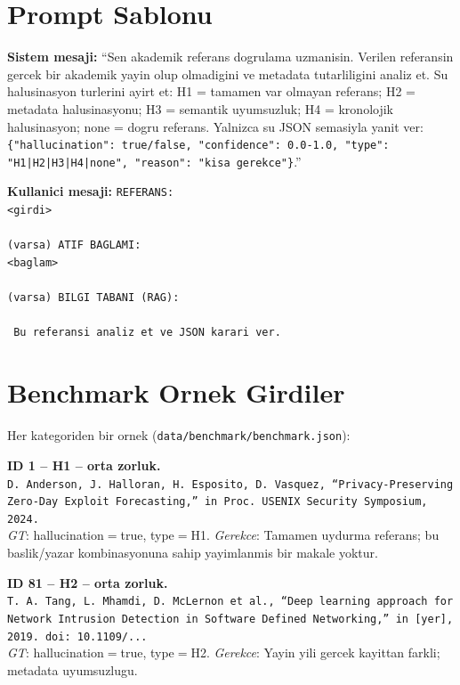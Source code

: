 \documentclass[11pt,a4paper]{article}
\begin{document}
\section{Prompt Sablonu}
\label{appx:prompt}
\textbf{Sistem mesaji:} ``Sen akademik referans dogrulama uzmanisin. Verilen
referansin gercek bir akademik yayin olup olmadigini ve metadata tutarliligini
analiz et. Su halusinasyon turlerini ayirt et: H1 = tamamen var olmayan
referans; H2 = metadata halusinasyonu; H3 = semantik uyumsuzluk;
H4 = kronolojik halusinasyon; none = dogru referans. Yalnizca su JSON
semasiyla yanit ver:
\texttt{\{"hallucination": true/false, "confidence": 0.0-1.0,
"type": "H1|H2|H3|H4|none", "reason": "kisa gerekce"\}}.''

\noindent\textbf{Kullanici mesaji:} \texttt{REFERANS:\\<girdi>\\\\(varsa)\
ATIF BAGLAMI:\\<baglam>\\\\(varsa)\ BILGI TABANI (RAG):\\<getirilen kayitlar>\\\
Bu referansi analiz et ve JSON karari ver.}

\section{Benchmark Ornek Girdiler}
\label{appx:benchmark}
Her kategoriden bir ornek (\texttt{data/benchmark/benchmark.json}):

\noindent\textbf{ID 1 -- H1 -- orta zorluk.}\\
\texttt{D. Anderson, J. Halloran, H. Esposito, D. Vasquez, ``Privacy-Preserving Zero-Day Exploit Forecasting,'' in Proc.\ USENIX Security Symposium, 2024.}\\
\textit{GT}: hallucination$=$true, type$=$H1.
\textit{Gerekce}: Tamamen uydurma referans; bu baslik/yazar kombinasyonuna
sahip yayimlanmis bir makale yoktur.

\medskip
\noindent\textbf{ID 81 -- H2 -- orta zorluk.}\\
\texttt{T.~A.~Tang, L.~Mhamdi, D.~McLernon et al., ``Deep learning approach for Network Intrusion Detection in Software Defined Networking,'' in [yer], 2019. doi: 10.1109/...}\\
\textit{GT}: hallucination$=$true, type$=$H2.
\textit{Gerekce}: Yayin yili gercek kayittan farkli; metadata uyumsuzlugu.
\end{document}
